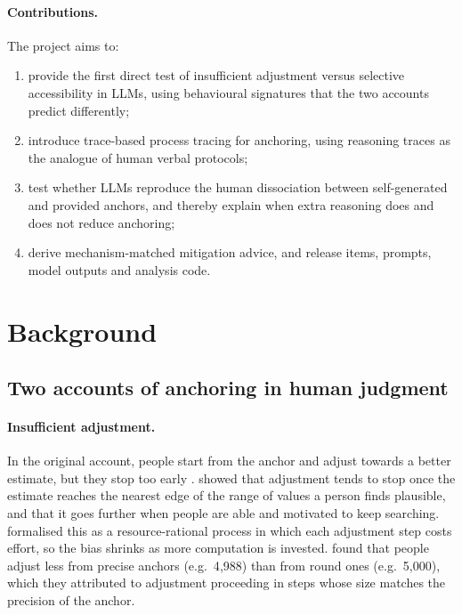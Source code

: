 \documentclass[11pt,a4paper]{article}
\begin{document}
\paragraph{Contributions.} The project aims to:
\begin{enumerate}
  \item provide the first direct test of insufficient adjustment versus selective accessibility in LLMs, using behavioural signatures that the two accounts predict differently;
  \item introduce trace-based process tracing for anchoring, using reasoning traces as the analogue of human verbal protocols;
  \item test whether LLMs reproduce the human dissociation between self-generated and provided anchors, and thereby explain when extra reasoning does and does not reduce anchoring;
  \item derive mechanism-matched mitigation advice, and release items, prompts, model outputs and analysis code.
\end{enumerate}

\section{Background}

\subsection{Two accounts of anchoring in human judgment}

\paragraph{Insufficient adjustment.} In the original account, people start from the anchor and adjust towards a better estimate, but they stop too early \citep{tversky1974judgment}. \citet{epley2006anchoring} showed that adjustment tends to stop once the estimate reaches the nearest edge of the range of values a person finds plausible, and that it goes further when people are able and motivated to keep searching. \citet{lieder2018anchoring} formalised this as a resource-rational process in which each adjustment step costs effort, so the bias shrinks as more computation is invested. \citet{janiszewski2008precision} found that people adjust less from precise anchors (e.g.\ 4{,}988) than from round ones (e.g.\ 5{,}000), which they attributed to adjustment proceeding in steps whose size matches the precision of the anchor.
\end{document}
